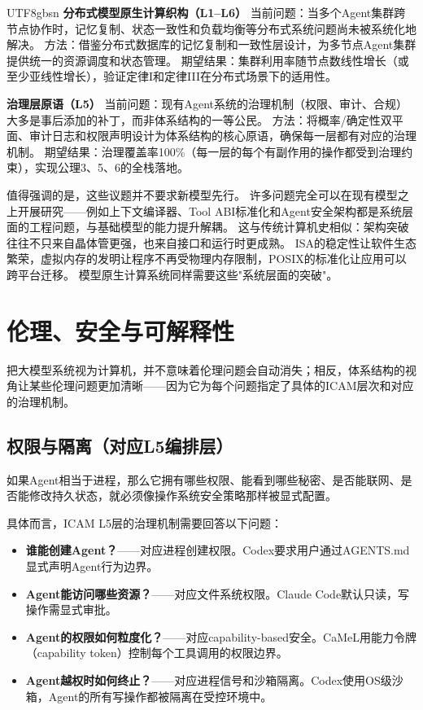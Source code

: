 \documentclass[11pt,a4paper]{article}
\begin{document}
\begin{CJK*}{UTF8}{gbsn}
\textbf{分布式模型原生计算织构（L1--L6）}
当前问题：当多个Agent集群跨节点协作时，记忆复制、状态一致性和负载均衡等分布式系统问题尚未被系统化地解决。
方法：借鉴分布式数据库的记忆复制和一致性层设计\cite{spanner2012,raft2014}，为多节点Agent集群提供统一的资源调度和状态管理。
期望结果：集群利用率随节点数线性增长（或至少亚线性增长），验证定律I和定律III在分布式场景下的适用性。

\textbf{治理层原语（L5）}
当前问题：现有Agent系统的治理机制（权限、审计、合规）大多是事后添加的补丁，而非体系结构的一等公民。
方法：将概率/确定性双平面、审计日志和权限声明设计为体系结构的核心原语\cite{arbiteros2025,ironclaw2025}，确保每一层都有对应的治理机制。
期望结果：治理覆盖率100\%（每一层的每个有副作用的操作都受到治理约束），实现公理3、5、6的全栈落地。

值得强调的是，这些议题并不要求新模型先行。
许多问题完全可以在现有模型之上开展研究——例如上下文编译器、Tool ABI标准化和Agent安全架构都是系统层面的工程问题，与基础模型的能力提升解耦。
这与传统计算机史相似：架构突破往往不只来自晶体管更强，也来自接口和运行时更成熟。
ISA的稳定性让软件生态繁荣，虚拟内存的发明让程序不再受物理内存限制，POSIX的标准化让应用可以跨平台迁移。
模型原生计算系统同样需要这些"系统层面的突破"。

\section{伦理、安全与可解释性}
\label{sec:ethics}

把大模型系统视为计算机，并不意味着伦理问题会自动消失；相反，体系结构的视角让某些伦理问题更加清晰——因为它为每个问题指定了具体的ICAM层次和对应的治理机制。

\subsection{权限与隔离（对应L5编排层）}

如果Agent相当于进程，那么它拥有哪些权限、能看到哪些秘密、是否能联网、是否能修改持久状态，就必须像操作系统安全策略那样被显式配置\cite{openai_codex_approvals_2026,openai_codex_sandbox_2026,anthropic_claudecode_security_2026,anthropic_claudecode_sandbox_2026,debenedetti2025camel,ironclaw2025}。

具体而言，ICAM L5层的治理机制需要回答以下问题：
\begin{itemize}[nosep]
\item \textbf{谁能创建Agent？}——对应进程创建权限。Codex要求用户通过AGENTS.md显式声明Agent行为边界\cite{openai_codex_agents_md_2026}。
\item \textbf{Agent能访问哪些资源？}——对应文件系统权限。Claude Code默认只读，写操作需显式审批\cite{anthropic_claudecode_security_2026}。
\item \textbf{Agent的权限如何粒度化？}——对应capability-based安全。CaMeL用能力令牌（capability token）控制每个工具调用的权限边界\cite{debenedetti2025camel}。
\item \textbf{Agent越权时如何终止？}——对应进程信号和沙箱隔离。Codex使用OS级沙箱，Agent的所有写操作都被隔离在受控环境中\cite{openai_codex_sandbox_2026}。
\end{itemize}


\end{CJK*}
\end{document}
